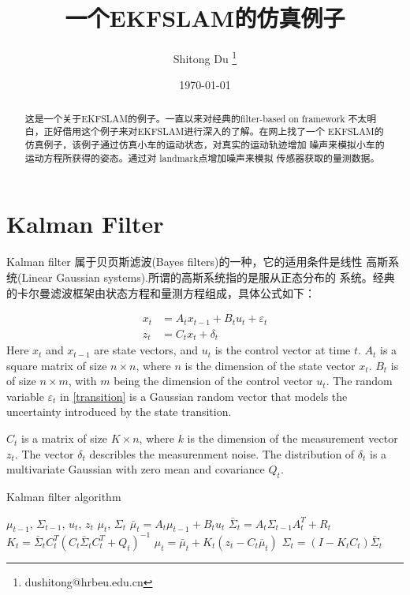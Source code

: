 \documentclass[UTF8,a4paper,10pt]{ctexart}
\title{一个EKFSLAM的仿真例子}
\author{ Shitong Du 
  \thanks{dushitong@hrbeu.edu.cn} 
}
\date{\today}
\begin{document}
    \maketitle
\begin{abstract}
这是一个关于EKFSLAM的例子。一直以来对经典的filter-based on framework 
不太明白，正好借用这个例子来对EKFSLAM进行深入的了解。在网上找了一个
EKFSLAM的仿真例子，该例子通过仿真小车的运动状态，对真实的运动轨迹增加
噪声来模拟小车的运动方程所获得的姿态。通过对 landmark点增加噪声来模拟
传感器获取的量测数据。
\end{abstract}
\section{Kalman Filter} 
\label{sec:one}
Kalman filter 属于贝页斯滤波(Bayes filters)的一种，它的适用条件是线性
高斯系统(Linear Gaussian systems).所谓的高斯系统指的是服从正态分布的
系统。经典的卡尔曼滤波框架由状态方程和量测方程组成，具体公式如下：

\begin{align}
x_t &= A_tx_{t-1}+B_tu_t+\varepsilon_t\\
z_t &= C_tx_t+\delta_t
\label{transition}
\end{align}
Here $x_t$ and $x_{t-1}$ are state vectors, and $u_t$ is the control vector 
at time $t$. $A_t$ is a square matrix of size $n \times n$, where $n$ is the 
dimension of the state vector $x_t$. $B_t$ is of size $n \times m$, with $m$ 
being the dimension of the control vector $u_t$. The random variable $\varepsilon_t$ 
in \eqref{transition} is a Gaussian random vector that models the uncertainty 
introduced by the state transition. 

$C_t$ is a matrix of size $K \times n$, where $k$ is the dimension of the 
measurement vector $z_t$. The vector $\delta_t$ describles the measurenment 
noise. The distribution of $\delta_t$ is a multivariate Gaussian with zero 
mean and covariance $	Q_t$.
\begin{algorithm}
    \caption{ Kalman filter algorithm }
    \label{alg:KF}
   \begin{algorithmic}[1]
       \Require $\mu_{t-1}$, $\Sigma_{t-1}$, $u_t$, $z_t$
       \Ensure $\mu_t$, $\Sigma_t$
       \State $\bar{\mu}_t=A_t\mu_{t-1}+B_tu_{t}$
       \State $\bar{\Sigma}_{t}=A_t\Sigma_{t-1}A_t^T+R_t$
       \State $K_t=\bar{\Sigma}_tC_t^T(C_t\bar{\Sigma}_tC_t^T+Q_t)^{-1}$
       \State $\mu_t=\bar{\mu}_t+K_t(z_t-C_t\bar{\mu}_t)$
       \State $\Sigma_t=(I-K_tC_t)\bar{\Sigma}_t$
       \State {} 
       \EndFunction
   \end{algorithmic}
\end{algorithm}
\end{document}
